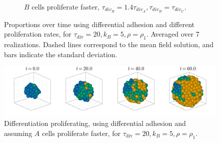 \begin{figure}[ht]
\begin{subfigure}{0.47\textwidth}
        \caption{$B$ cells proliferate faster, $\tau_{div_B}=1.4\tau_{div_A}, \tau_{div_B}=\tau_{div_C}$.}
        \label{fig:diff-prolif-proportions-b}
    \end{subfigure}
    \caption{Proportions over time using differential adhesion and different proliferation rates, for $\tau_\text{div}=20, k_B=5, \rho=\rho_1$. Averaged over 7 realizations. Dashed lines correspond to the mean field solution, and bars indicate the standard deviation.}
    \label{fig:diff-prolif-proportions}
\end{figure}

\begin{figure}[ht]
        \centering
        \includegraphics[width=\textwidth]{figures/411/411-aggregate-afaster-all.png}
    \caption{Differentiation proliferating, using differential adhesion and assuming $A$ cells proliferate faster, for $\tau_\text{div}=20, k_B=5, \rho=\rho_1$.}
    \label{fig:diff-prolif-aggregates}
\end{figure}

